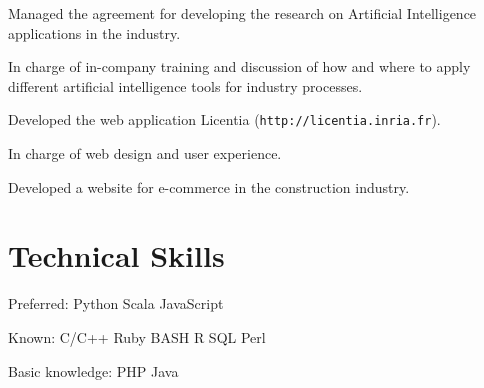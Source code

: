 \documentclass[]{deedy-resume-openfont}
\begin{document}
\begin{tightemize}
\item Managed the agreement for developing the research on Artificial Intelligence applications in the industry.
\item In charge of in-company training and discussion of how and where to apply different artificial 
      intelligence tools for industry processes.
\end{tightemize}
\sectionsep

\begin{tightemize}
\item Developed the web application Licentia (\texttt{http://licentia.inria.fr}).
\item In charge of web design and user experience.
\end{tightemize}
\sectionsep

\begin{tightemize}
\item Developed a website for e-commerce in the construction industry.
\end{tightemize}
\sectionsep


\section{Technical Skills}

\descript{}
\begin{tightemize}
\item Preferred: Python \textbullet{} Scala \textbullet{} JavaScript
\item Known: C/C++ \textbullet{} Ruby \textbullet{} 
BASH \textbullet{} R \textbullet{} SQL \textbullet{} Perl %
\item Basic knowledge: PHP \textbullet{} Java %
\end{tightemize}
\sectionsep
\end{document}
